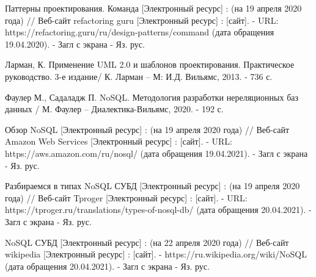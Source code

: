 \documentclass[14pt]{extreport}
\begin{document}
\begin{thebibliography}{9}
  Паттерны проектирования. Команда [Электронный ресурс] : (на 19 апреля 2020 года) // Веб-сайт refactoring guru [Электронный ресурс] : [сайт]. - URL: https://refactoring.guru/ru/design-patterns/command (дата обращения 19.04.2020). - Загл с экрана - Яз. рус.
  
  Ларман, К. Применение UML 2.0 и шаблонов проектирования. Практическое руководство. 3-е издание/ К. Ларман -- М: И.Д. Вильямс, 2013. - 736 с.
  
     Фаулер М., Садаладж П. NoSQL. Методология разработки нереляционных баз данных / М. Фаулер -- Диалектика-Вильямс, 2020. - 192 с.
     
Обзор NoSQL [Электронный ресурс] : (на 19 апреля 2020 года) // Веб-сайт Amazon Web Services [Электронный ресурс] : [сайт]. - URL: https://aws.amazon.com/ru/nosql/ (дата обращения 19.04.2021). - Загл с экрана - Яз. рус.

Разбираемся в типах NoSQL СУБД [Электронный ресурс] : (на 19 апреля 2020 года) // Веб-сайт Tproger [Электронный ресурс] : [сайт]. - URL: https://tproger.ru/translations/types-of-nosql-db/ (дата обращения 20.04.2021). - Загл с экрана - Яз. рус.

NoSQL СУБД [Электронный ресурс] : (на 22 апреля 2020 года) // Веб-сайт wikipedia [Электронный ресурс] : [сайт]. - https://ru.wikipedia.org/wiki/NoSQL (дата обращения 20.04.2021). - Загл с экрана - Яз. рус.



 
 
 
 
\end{thebibliography}


\end{document}
